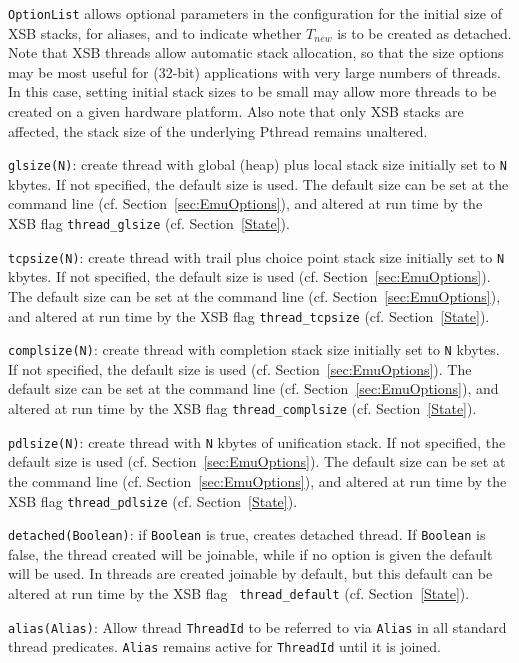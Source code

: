 \begin{description}
{\tt OptionList} allows optional parameters in the configuration for
the initial size of XSB stacks, for aliases, and to indicate whether
$T_{new}$ is to be created as detached.  Note that XSB threads allow
automatic stack allocation, so that the size options may be most
useful for (32-bit) applications with very large numbers of threads.
In this case, setting initial stack sizes to be small may allow more
threads to be created on a given hardware platform.  Also note that
only XSB stacks are affected, the stack size of the underlying Pthread
remains unaltered.
%
\bi
\item {\tt glsize(N)}: create thread with global (heap) plus local
  stack size initially set to {\tt N} kbytes.  If not specified, the
  default size is used.  The default size can be set at the command
  line (cf. Section~\ref{sec:EmuOptions}), and altered at run time by
  the XSB flag {\tt thread\_glsize} (cf. Section~\ref{State}).
%
\item {\tt tcpsize(N)}: create thread with trail plus choice point
  stack size initially set to {\tt N} kbytes.  If not specified, the
  default size is used (cf. Section~\ref{sec:EmuOptions}).  The
  default size can be set at the command line
  (cf. Section~\ref{sec:EmuOptions}), and altered at run time by the
  XSB flag {\tt thread\_tcpsize} (cf. Section~\ref{State}).
%
\item {\tt complsize(N)}: create thread with completion stack size
  initially set to {\tt N} kbytes. If not specified, the default size
  is used (cf. Section~\ref{sec:EmuOptions}).  The default size can be
  set at the command line (cf. Section~\ref{sec:EmuOptions}), and
  altered at run time by the XSB flag {\tt thread\_complsize}
  (cf. Section~\ref{State}).
%
\item {\tt pdlsize(N)}: create thread with {\tt N} kbytes of
  unification stack.  If not specified, the default size is used
  (cf. Section~\ref{sec:EmuOptions}).  The default size can be set at
  the command line (cf. Section~\ref{sec:EmuOptions}), and altered at
  run time by the XSB flag {\tt thread\_pdlsize}
  (cf. Section~\ref{State}).
%
\item {\tt detached(Boolean)}: if {\tt Boolean} is true, creates
  detached thread.  If {\tt Boolean} is false, the thread created will
  be joinable, while if no option is given the default will be used.
  In \version{} threads are created joinable by default, but this
  default can be altered at run time by the XSB flag {\tt
    thread\_default} (cf. Section~\ref{State}).
%
\item {\tt alias(Alias)}: Allow thread {\tt ThreadId} to be referred
  to via {\tt Alias} in all standard thread predicates.  {\tt Alias}
  remains active for {\tt ThreadId} until it is joined.  
\ei


\end{description}
